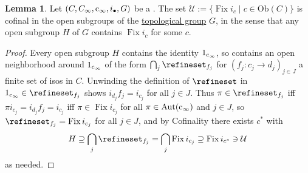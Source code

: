 \documentclass[
  sigconf,
  screen, ]{acmart}
\theoremstyle{definition}
\newtheorem{lemma}[theorem]{Lemma}
\newcommand\Aut{\operatorname{Aut}}
\newcommand\calU{\mathcal U}
\newcommand\nref[2]{\hyperref[#1]{#2}} \newcommand\checkhigh{{\huge{\color{red}\textbf{TODO: check}}}}
\newcommand\Fix{\operatorname{Fix}}
\newcommand\cinfty{{{\rm c}_\infty}}
\begin{document}
\begin{lemma} \label{app:lem:fix-is-cofinal}
   Let $(C,C_\infty,\cinfty,i_\bullet,G)$
   be a .
  The set $\mathcal U := \{\Fix{i_c} \mid c \in \mathrm{Ob}(C)\}$
  is cofinal in the open subgroups of 
  the \nref{app:lem:aut-continuous}{topological group} $G$,
  in the sense that
  any open subgroup $H$ of $G$
  contains $\Fix{i_c}$ for some $c$.
\end{lemma}
\begin{proof}
  Every open subgroup $H$ contains the identity $1_\cinfty$,
  so contains an open neighborhood around $1_\cinfty$
  of the form $\bigcap_j \refineset_{f_j}$
  for $(f_j : c_j\to d_j)_{j\in J}$ a finite set of isos in $C$.
  Unwinding the definition of $\refineset$
  in $1_\cinfty\in\refineset_{f_j}$ shows
  $i_{d_j} f_j = i_{c_j}$ for all $j\in J$.
  Thus $\pi\in\refineset_{f_j}$
  iff $\pi i_{c_j} = i_{d_j} f_j = i_{c_j}$
  iff $\pi\in\Fix i_{c_j}$
  for all $\pi\in\Aut(\cinfty)$ and $j\in J$,
  so $\refineset_{f_j} = \Fix i_{c_j}$ for all $j\in J$,
  and by Cofinality there exists $c^*$
  with
  \[ H \supseteq \bigcap_j \refineset_{f_j} = \bigcap_j \Fix i_{c_j} \supseteq \Fix i_{c^*}\ni \calU \]
  as needed.
\end{proof}
\end{document}

